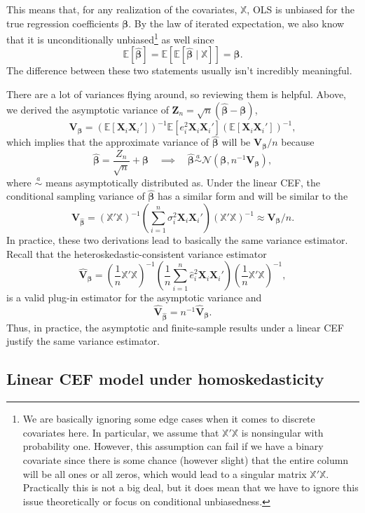 \documentclass[
  13pt,
  letterpaper,
  DIV=11,
  numbers=noendperiod]{scrreprt}
\newcommand{\mb}{\bm}
\newcommand{\E}{\mathbb{E}}
\newcommand{\N}{\mathcal{N}}
\newcommand{\X}{\mb{X}}
\newcommand{\Xmat}{\mathbb{X}}
\newcommand{\bfbeta}{\mb{\beta}}
\newcommand{\bhat}{\widehat{\mb{\beta}}}
\theoremstyle{plain}
\theoremstyle{plain}
\theoremstyle{definition}
\theoremstyle{definition}
\theoremstyle{remark}
\begin{document}
This means that, for any realization of the covariates, \(\Xmat\), OLS
is unbiased for the true regression coefficients \(\bfbeta\). By the law
of iterated expectation, we also know that it is unconditionally
unbiased\footnote{We are basically ignoring some edge cases when it
  comes to discrete covariates here. In particular, we assume that
  \(\Xmat'\Xmat\) is nonsingular with probability one. However, this
  assumption can fail if we have a binary covariate since there is some
  chance (however slight) that the entire column will be all ones or all
  zeros, which would lead to a singular matrix \(\Xmat'\Xmat\).
  Practically this is not a big deal, but it does mean that we have to
  ignore this issue theoretically or focus on conditional unbiasedness.}
as well since \[
\E[\bhat] = \E[\E[\bhat \mid \Xmat]] = \bfbeta. 
\] The difference between these two statements usually isn't incredibly
meaningful.

There are a lot of variances flying around, so reviewing them is
helpful. Above, we derived the asymptotic variance of
\(\mb{Z}_{n} = \sqrt{n}(\bhat - \bfbeta)\), \[
\mb{V}_{\bfbeta} = \left( \E[\X_i\X_i'] \right)^{-1}\E[e_i^2\X_i\X_i']\left( \E[\X_i\X_i'] \right)^{-1},
\] which implies that the approximate variance of \(\bhat\) will be
\(\mb{V}_{\bfbeta} / n\) because \[
\bhat = \frac{Z_n}{\sqrt{n}} + \bfbeta \quad\implies\quad \bhat \overset{a}{\sim} \N(\bfbeta, n^{-1}\mb{V}_{\bfbeta}),
\] where \(\overset{a}{\sim}\) means asymptotically distributed as.
Under the linear CEF, the conditional sampling variance of \(\bhat\) has
a similar form and will be similar to the\\
\[
\mb{V}_{\bhat} = \left( \Xmat'\Xmat \right)^{-1}\left( \sum_{i=1}^n \sigma^2_i \X_i\X_i' \right) \left( \Xmat'\Xmat \right)^{-1} \approx \mb{V}_{\bfbeta} / n.
\] In practice, these two derivations lead to basically the same
variance estimator. Recall that the heteroskedastic-consistent variance
estimator \[
\widehat{\mb{V}}_{\bfbeta} = \left( \frac{1}{n} \Xmat'\Xmat \right)^{-1} \left( \frac{1}{n} \sum_{i=1}^n\widehat{e}_i^2\X_i\X_i' \right) \left( \frac{1}{n} \Xmat'\Xmat \right)^{-1},
\] is a valid plug-in estimator for the asymptotic variance and \[
\widehat{\mb{V}}_{\bhat} = n^{-1}\widehat{\mb{V}}_{\bfbeta}.
\] Thus, in practice, the asymptotic and finite-sample results under a
linear CEF justify the same variance estimator.

\subsection{Linear CEF model under
homoskedasticity}\label{linear-cef-model-under-homoskedasticity}
\end{document}
